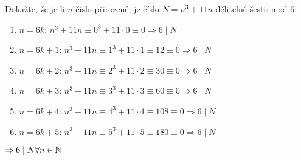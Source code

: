 \begin{example}[SÚM 145/312]
  Dokažte, že je-li $n$ číslo přirozené, je číslo $N = n^3 + 11n$ dělitelné šesti:
  mod 6:
  \begin{enumerate}
    \item $n = 6k$: $n^3 + 11n \equiv 0^3 + 11\cdot0 \equiv 0 \Rightarrow 6 \mid N$
    \item $n = 6k + 1$: $n^3 + 11n \equiv 1^3 + 11\cdot1 \equiv 12 \equiv 0 \Rightarrow 6 \mid N$
    \item $n = 6k + 2$: $n^3 + 11n \equiv 2^3 + 11\cdot2 \equiv 30 \equiv 0 \Rightarrow 6 \mid N$
    \item $n = 6k + 3$: $n^3 + 11n \equiv 3^3 + 11\cdot3 \equiv 60 \equiv 0 \Rightarrow 6 \mid N$
    \item $n = 6k + 4$: $n^3 + 11n \equiv 4^3 + 11\cdot4 \equiv 108 \equiv 0 \Rightarrow 6 \mid N$
    \item $n = 6k + 5$: $n^3 + 11n \equiv 5^3 + 11\cdot5 \equiv 180 \equiv 0 \Rightarrow 6 \mid N$
  \end{enumerate}
  $\Rightarrow 6 \mid N \forall n \in \mathbb{N}$
\end{example}

\begin{example}[SÚM 145/315]

\end{example}
